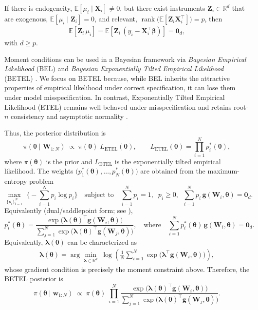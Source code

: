 If there is endogeneity, $\mathbb{E}[\mu_i\mid \mathbf{X}_i]\neq 0$, but there exist instruments $\mathbf{Z}_i\in\mathbb{R}^{d}$ that are exogenous, $\mathbb{E}[\mu_i\mid \mathbf{Z}_i]=0$, and relevant, $\operatorname{rank}\!\big(\mathbb{E}[\mathbf{Z}_i\mathbf{X}_i^{\top}]\big)=p$, then
\begin{align*}
	\mathbb{E}\!\left[\mathbf{Z}_i\,\mu_i\right]
	=\mathbb{E}\!\left[\mathbf{Z}_i\,(y_i-\mathbf{X}_i^{\top}\boldsymbol{\beta})\right]
	=\mathbf{0}_{d},
\end{align*}
with $d\ge p$.

Moment conditions can be used in a Bayesian framework via \emph{Bayesian Empirical Likelihood} (BEL) \cite{lazar2003bel} and \emph{Bayesian Exponentially Tilted Empirical Likelihood} (BETEL) \cite{schennach2005betel}. We focus on BETEL because, while BEL inherits the attractive properties of empirical likelihood under correct specification, it can lose them under model misspecification. In contrast, Exponentially Tilted Empirical Likelihood (ETEL) remains well behaved under misspecification and retains root-$n$ consistency and asymptotic normality \cite{schennach2007etel}.

Thus, the posterior distribution is
\[
\pi(\boldsymbol{\theta}\mid \mathbf{W}_{1:N})
\;\propto\;
\pi(\boldsymbol{\theta})\; L_{\mathrm{ETEL}}(\boldsymbol{\theta}),
\qquad
L_{\mathrm{ETEL}}(\boldsymbol{\theta})=\prod_{i=1}^N p_i^{*}(\boldsymbol{\theta}),
\]
where $\pi(\boldsymbol{\theta})$ is the prior and $L_{\mathrm{ETEL}}$ is the exponentially tilted empirical likelihood. The weights
$\big(p_1^{*}(\boldsymbol{\theta}),\dots,p_N^{*}(\boldsymbol{\theta})\big)$ are obtained from the maximum-entropy problem
\[
\max_{\{p_i\}_{i=1}^N}\;\Big\{-\sum_{i=1}^N p_i\log p_i\Big\}
\quad\text{subject to}\quad
\sum_{i=1}^N p_i=1,\;\; p_i\ge 0,\;\;
\sum_{i=1}^N p_i\,\mathbf{g}(\mathbf{W}_i,\boldsymbol{\theta})=\mathbf{0}_d.
\]
Equivalently (dual/saddlepoint form; see \cite{schennach2005betel,chib2018moment,schennach2007etel}),
\[
p_i^{*}(\boldsymbol{\theta})
=\frac{\exp\!\big(\boldsymbol{\lambda}(\boldsymbol{\theta})^{\top}\mathbf{g}(\mathbf{W}_i,\boldsymbol{\theta})\big)}
{\sum_{j=1}^N \exp\!\big(\boldsymbol{\lambda}(\boldsymbol{\theta})^{\top}\mathbf{g}(\mathbf{W}_j,\boldsymbol{\theta})\big)},
\quad\text{where}\quad
\sum_{i=1}^N p_i^{*}(\boldsymbol{\theta})\,\mathbf{g}(\mathbf{W}_i,\boldsymbol{\theta})=\mathbf{0}_d.
\]
Equivalently, $\boldsymbol{\lambda}(\boldsymbol{\theta})$ can be characterized as
\begin{align}\label{eqLambda}
\boldsymbol{\lambda}(\boldsymbol{\theta})
=\arg\min_{\boldsymbol{\lambda}\in\mathbb{R}^{d}}
\;\log\!\left(\frac{1}{N}\sum_{i=1}^N
\exp\!\big(\boldsymbol{\lambda}^{\top}\mathbf{g}(\mathbf{W}_i,\boldsymbol{\theta})\big)\right),
\end{align}
whose gradient condition is precisely the moment constraint above. Therefore, the BETEL posterior is
\[
\pi(\boldsymbol{\theta}\mid \mathbf{w}_{1:N})
\;\propto\;
\pi(\boldsymbol{\theta})\;
\prod_{i=1}^N
\frac{\exp\!\big(\boldsymbol{\lambda}(\boldsymbol{\theta})^{\top}\mathbf{g}(\mathbf{W}_i,\boldsymbol{\theta})\big)}
{\sum_{j=1}^N \exp\!\big(\boldsymbol{\lambda}(\boldsymbol{\theta})^{\top}\mathbf{g}(\mathbf{W}_j,\boldsymbol{\theta})\big)}.
\]

